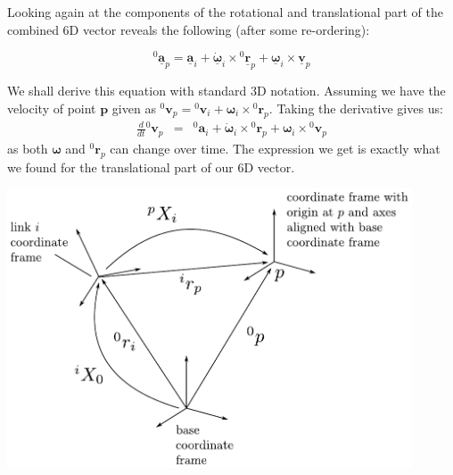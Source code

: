 \documentclass[a4paper]{article}
\newcommand{\Nspa}[1]{\mathbf{\underline{#1}}}
\newcommand{\Vec}[1]{\mathbf{#1}}
\begin{document}
Looking again at the components of the rotational and translational part of
the combined 6D vector reveals the following (after some re-ordering):

\begin{equation}
	{}^0\Nspa{a}_p = \Nspa{a}_i +
	\Nspa{\dot{\omega}}_i
	\times
	{}^0\Nspa{r}_p
	+
	\Nspa{\omega}_i \times \Nspa{v}_p
	\label{}
\end{equation}


We shall derive this equation with standard 3D notation. Assuming we have the
velocity of point $\Vec{p}$ given as ${}^0\Vec{v}_p = {}^0\Vec{v}_i + \Vec{\omega}_i
\times {}^0\Vec{r}_p$. Taking the derivative gives us:
\begin{eqnarray}
	\frac{d}{dt} {}^0 \Vec{v}_p & = & {}^0 \Vec{a}_i + \Vec{\dot{\omega}}_i \times
	{}^0 \Vec{r}_p + \Vec{\omega}_i \times {}^0 \Vec{ v}_p
	\label{}
\end{eqnarray}
as both $\Vec{\omega}$ and ${}^0\Vec{r}_p$ can change over time. The
expression we get is exactly what we found for the translational part of our 6D vector.

\includegraphics[width=0.9\textwidth]{acceleration_visualization}
\end{document}
